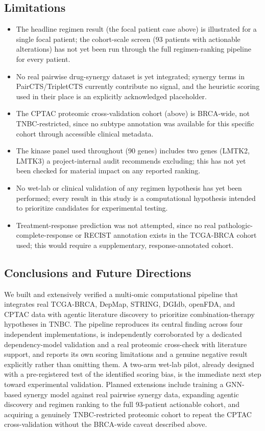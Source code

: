 \documentclass[10pt,letterpaper]{article}
\begin{document}
\subsection*{Limitations}
\begin{itemize}
\item The headline regimen result (the focal patient case above) is illustrated for a single focal patient; the cohort-scale screen (93 patients with actionable alterations) has not yet been run through the full regimen-ranking pipeline for every patient.
\item No real pairwise drug-synergy dataset is yet integrated; synergy terms in PairCTS/TripletCTS currently contribute no signal, and the heuristic scoring used in their place is an explicitly acknowledged placeholder.
\item The CPTAC proteomic cross-validation cohort (above) is BRCA-wide, not TNBC-restricted, since no subtype annotation was available for this specific cohort through accessible clinical metadata.
\item The kinase panel used throughout (90 genes) includes two genes (LMTK2, LMTK3) a project-internal audit recommends excluding; this has not yet been checked for material impact on any reported ranking.
\item No wet-lab or clinical validation of any regimen hypothesis has yet been performed; every result in this study is a computational hypothesis intended to prioritize candidates for experimental testing.
\item Treatment-response prediction was not attempted, since no real pathologic-complete-response or RECIST annotation exists in the TCGA-BRCA cohort used; this would require a supplementary, response-annotated cohort.
\end{itemize}

\subsection*{Conclusions and Future Directions}
We built and extensively verified a multi-omic computational pipeline that integrates real TCGA-BRCA, DepMap, STRING, DGIdb, openFDA, and CPTAC data with agentic literature discovery to prioritize combination-therapy hypotheses in TNBC. The pipeline reproduces its central finding across four independent implementations, is independently corroborated by a dedicated dependency-model validation and a real proteomic cross-check with literature support, and reports its own scoring limitations and a genuine negative result explicitly rather than omitting them. A two-arm wet-lab pilot, already designed with a pre-registered test of the identified scoring bias, is the immediate next step toward experimental validation. Planned extensions include training a GNN-based synergy model against real pairwise synergy data, expanding agentic discovery and regimen ranking to the full 93-patient actionable cohort, and acquiring a genuinely TNBC-restricted proteomic cohort to repeat the CPTAC cross-validation without the BRCA-wide caveat described above.
\end{document}
